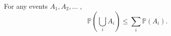 For any events  $ A_1,A_2, \ldots $ ,
 \[  \mathbb{P}  \left(  \bigcup_i A_i  \right) \leq   \sum_i  \mathbb{P}(A_i). \]


